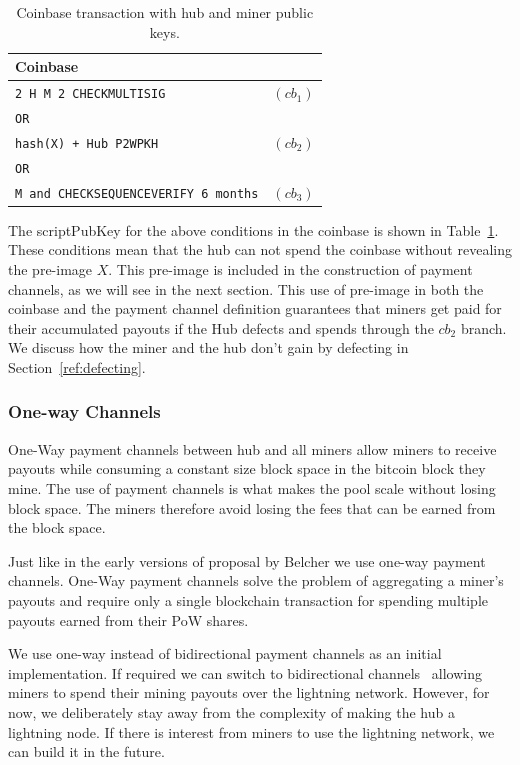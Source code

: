 \documentclass{article}
\begin{document}
\begin{table}
  \centering
  \begin{tabular}{ lr }
    \bfseries Coinbase \\
    \midrule
    \verb|2 H M 2 CHECKMULTISIG| & $(cb_1)$ \\
    \verb|OR| \\
    \verb|hash(X) + Hub P2WPKH| & $(cb_2)$ \\
    \verb|OR| \\
    \verb|M and CHECKSEQUENCEVERIFY 6 months| & $(cb_3)$\\ 
    \midrule
  \end{tabular}
  \caption{Coinbase transaction with hub and miner public keys.}\label{table:coinbase}
\end{table}

The scriptPubKey for the above conditions in the coinbase is shown in
Table~\ref{table:coinbase}. These conditions mean that the hub can not
spend the coinbase without revealing the pre-image $X$. This pre-image
is included in the construction of payment channels, as we will see in
the next section. This use of pre-image in both the coinbase and the
payment channel definition guarantees that miners get paid for their
accumulated payouts if the Hub defects and spends through the $cb_2$
branch. We discuss how the miner and the hub don't gain by defecting
in Section~\ref{ref:defecting}.

\subsubsection{One-way Channels}

One-Way payment channels between hub and all miners allow miners to
receive payouts while consuming a constant size block space in the
bitcoin block they mine. The use of payment channels is what makes the
pool scale without losing block space. The miners therefore avoid
losing the fees that can be earned from the block space.

Just like in the early versions of proposal by Belcher we use one-way
payment channels. One-Way payment channels solve the problem of
aggregating a miner's payouts and require only a single blockchain
transaction for spending multiple payouts earned from their PoW
shares.

We use one-way instead of bidirectional payment channels as an initial
implementation. If required we can switch to bidirectional
channels~\cite{poon2016bitcoin} allowing miners to spend their mining
payouts over the lightning network. However, for now, we deliberately
stay away from the complexity of making the hub a lightning node. If
there is interest from miners to use the lightning network, we can
build it in the future.
\end{document}
